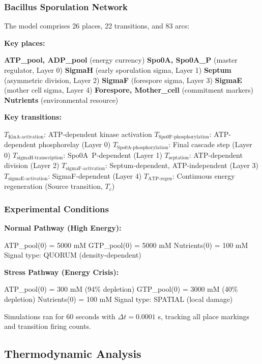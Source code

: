 \documentclass[twocolumn,11pt]{article}
\begin{document}
\subsubsection{Bacillus Sporulation Network}

The model comprises 26 places, 22 transitions, and 83 arcs:

\textbf{Key places:}

\textbf{ATP\_pool, ADP\_pool} (energy currency)
\textbf{Spo0A, Spo0A\_P} (master regulator, Layer 0)
\textbf{SigmaH} (early sporulation sigma, Layer 1)
\textbf{Septum} (asymmetric division, Layer 2)
\textbf{SigmaF} (forespore sigma, Layer 3)
\textbf{SigmaE} (mother cell sigma, Layer 4)
\textbf{Forespore, Mother\_cell} (commitment markers)
\textbf{Nutrients} (environmental resource)


\textbf{Key transitions:}

$T_{\text{KinA-activation}}$: ATP-dependent kinase activation
$T_{\text{Spo0F-phosphorylation}}$: ATP-dependent phosphorelay (Layer 0)
$T_{\text{Spo0A-phosphorylation}}$: Final cascade step (Layer 0)
$T_{\text{sigmaH-transcription}}$: Spo0A~P-dependent (Layer 1)
$T_{\text{septation}}$: ATP-dependent division (Layer 2)
$T_{\text{sigmaF-activation}}$: Septum-dependent, ATP-independent (Layer 3)
$T_{\text{sigmaE-activation}}$: SigmaF-dependent (Layer 4)
$T_{\text{ATP-regen}}$: Continuous energy regeneration (Source transition, $T_c$)


\subsubsection{Experimental Conditions}

\textbf{Normal Pathway (High Energy):}

ATP\_pool(0) = 5000 mM
GTP\_pool(0) = 5000 mM
Nutrients(0) = 100 mM
Signal type: QUORUM (density-dependent)


\textbf{Stress Pathway (Energy Crisis):}

ATP\_pool(0) = 300 mM (94\% depletion)
GTP\_pool(0) = 3000 mM (40\% depletion)
Nutrients(0) = 100 mM
Signal type: SPATIAL (local damage)


Simulations ran for 60 seconds with $\Delta t = 0.0001$ s, tracking all place markings and transition firing counts.

\subsection{Thermodynamic Analysis}
\end{document}
